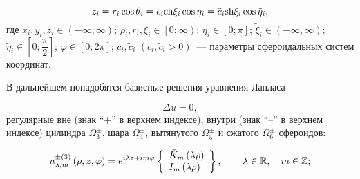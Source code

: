 \begin{equation}\label{eq:1:2}
{z_i} = {r_i}\cos {\theta _i} = {c_i}{\mathop{\rm ch}\nolimits} {\xi _i}\cos {\eta _i} = {\tilde c_i}{\mathop{\rm sh}\nolimits} {\tilde \xi _i}\cos {\tilde \eta _i},
\end{equation}
\noindent где ${x_i},{y_i},{z_i} \in \left( { - \infty ;\infty } \right)$; ${\rho _i},{r_i},{\xi _i} \in \left[ {\left. {0;\infty } \right)} \right.$; ${\eta _i} \in \left[ {0;\pi } \right]$; ${\tilde \xi _i} \in \left( { - \infty ,\infty } \right)$; ${\tilde \eta _i} \in \left[ {0;\dfrac{\pi }{2}} \right]$; $\varphi  \in \left[ {0;2\pi } \right]$; ${c_i},{\tilde c_i}$ $\left( {{c_i},{{\tilde c}_i} > 0} \right)$~--- параметры сфероидальных систем координат.

В дальнейшем понадобятся базисные решения уравнения Лапласа

\begin{equation}
\Delta u = 0,
\end{equation}
\noindent регулярные вне (знак ``+'' в верхнем индексе), внутри (знак ``--'' в верхнем индексе) цилиндра $\Omega _3^ \pm$, шара $\Omega _4^ \pm$, вытянутого $\Omega _5^ \pm $ и сжатого $\Omega _6^ \pm $ сфероидов:

\begin{equation}\label{eq:1:4}
u_{\lambda ,m}^{ \pm (3)}\left( {\rho ,z,\varphi } \right) = {e^{i\lambda z + im\varphi }}\left\{ \begin{array}{l}
{{\tilde K}_m}\left( {\lambda \rho } \right)\\
{I_m}\left( {\lambda \rho } \right)
\end{array} \right\},\qquad {\kern 1pt} \lambda  \in \mathbb{R},\quad m \in \mathbb{Z};
\end{equation}

